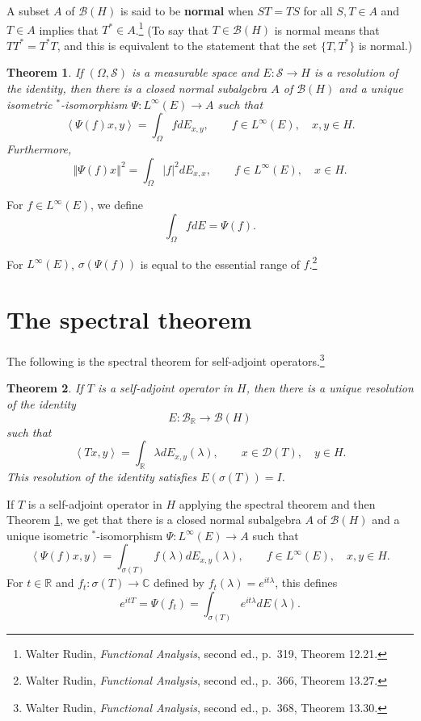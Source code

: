 \documentclass{article}
\newcommand{\inner}[2]{\left\langle #1, #2 \right\rangle}
\newcommand{\norm}[1]{\left\Vert #1 \right\Vert}
\newtheorem{theorem}{Theorem}
\theoremstyle{definition}
\begin{document}
A subset $A$ of $\mathscr{B}(H)$ is said to be \textbf{normal} when $ST=TS$ for all $S,T \in A$ and $T \in A$ implies that
$T^* \in A$.\footnote{Walter Rudin, {\em Functional Analysis}, second ed., p.~319, Theorem 12.21.} (To say that $T \in \mathscr{B}(H)$
is normal means that $TT^*=T^*T$, and this is equivalent to the statement that the set $\{T,T^*\}$ is normal.)

\begin{theorem}
If $(\Omega,\mathscr{S})$ is a measurable space and $E:\mathscr{S} \to H$ is a resolution of the identity, then there
is a closed normal subalgebra $A$ of $\mathscr{B}(H)$ and
 a unique isometric
$^*$-isomorphism $\Psi:L^\infty(E) \to A$ such that 
\[
\inner{\Psi(f)x}{y} = \int_{\Omega} f dE_{x,y}, \qquad f \in L^\infty(E), \quad x,y \in H.
\]
Furthermore,
\[
\norm{\Psi(f)x}^2 = \int_{\Omega} |f|^2 dE_{x,x}, \qquad f \in L^\infty(E), \quad x \in H.
\]
\label{starisomorphism}
\end{theorem}

For $f \in L^\infty(E)$, we define
\[
\int_\Omega f dE = \Psi(f).
\]

For $L^\infty(E)$, $\sigma(\Psi(f))$ is equal to the essential range of
 $f$.\footnote{Walter Rudin, {\em Functional Analysis}, second ed., p.~366, Theorem 13.27.}
 




\section{The spectral theorem}
The following is the spectral theorem for self-adjoint operators.\footnote{Walter Rudin, {\em Functional Analysis}, second ed., p.~368, Theorem 13.30.}

\begin{theorem}
If $T$ is a self-adjoint operator in $H$, then there is a unique resolution of the identity
\[
E: \mathscr{B}_{\mathbb{R}} \to \mathscr{B}(H)
\]
such that 
\[
\inner{Tx}{y} = \int_{\mathbb{R}} \lambda dE_{x,y}(\lambda), \qquad x \in \mathscr{D}(T), \quad y \in H.
\]
This resolution of the identity satisfies $E(\sigma(T))=I$. 
\label{spectral}
\end{theorem}

If $T$ is a self-adjoint operator in $H$
applying the spectral theorem and then
 Theorem \ref{starisomorphism},
 we get that there is a closed normal subalgebra $A$ of $\mathscr{B}(H)$ and a unique isometric
 $^*$-isomorphism $\Psi:L^\infty(E) \to A$ such that
 \[
 \inner{\Psi(f)x}{y} = \int_{\sigma(T)} f(\lambda) dE_{x,y}(\lambda), \qquad f \in L^\infty(E), \quad x,y\in H.
 \]
For $t \in \mathbb{R}$ and 
 $f_t:\sigma(T) \to \mathbb{C}$ defined by
 $f_t(\lambda)=e^{it\lambda}$, this defines
 \[
e^{itT} = \Psi(f_t) =  \int_{\sigma(T)} e^{it\lambda} dE(\lambda).
 \]
\end{document}
